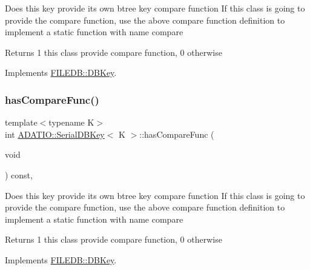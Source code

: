 Does this key provide its own btree key compare function If this class is going to provide the compare function, use the above compare function definition to implement a static function with name compare

\begin{DoxyReturn}{Returns}
1 this class provide compare function, 0 otherwise 
\end{DoxyReturn}


Implements \mbox{\hyperlink{classFILEDB_1_1DBKey_a416c32ba10caf76e6b7ff4986cfc3c05}{F\+I\+L\+E\+D\+B\+::\+D\+B\+Key}}.

\mbox{\label{classADATIO_1_1SerialDBKey_a2f28d2ac39919d9cb9f6fc097944c49c}} 
\subsubsection{\texorpdfstring{hasCompareFunc()}{hasCompareFunc()}\hspace{0.1cm}{\footnotesize\ttfamily [2/3]}}
{\footnotesize\ttfamily template$<$typename K$>$ \\
int \mbox{\hyperlink{classADATIO_1_1SerialDBKey}{A\+D\+A\+T\+I\+O\+::\+Serial\+D\+B\+Key}}$<$ K $>$\+::has\+Compare\+Func (\begin{DoxyParamCaption}\item[{void}]{ }\end{DoxyParamCaption}) const\hspace{0.3cm}{\ttfamily [inline]}, {\ttfamily [virtual]}}

Does this key provide its own btree key compare function If this class is going to provide the compare function, use the above compare function definition to implement a static function with name compare

\begin{DoxyReturn}{Returns}
1 this class provide compare function, 0 otherwise 
\end{DoxyReturn}


Implements \mbox{\hyperlink{classFILEDB_1_1DBKey_a416c32ba10caf76e6b7ff4986cfc3c05}{F\+I\+L\+E\+D\+B\+::\+D\+B\+Key}}.

\mbox{\label{classADATIO_1_1SerialDBKey_a2f28d2ac39919d9cb9f6fc097944c49c}} 
